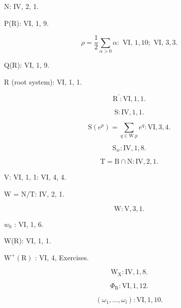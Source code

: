 N: IV, 2, 1.

P(R): VI, 1, 9.

\[
\rho = \frac {1}{2} \sum_ {\alpha > 0} \alpha : \text { VI, } 1, 10; \text { VI, } 3, 3.
\]

Q(R): VI, 1, 9.

R (root system): VI, 1, 1.

\[
\mathrm{R} ^ {\prime}: \mathrm{VI}, 1, 1.
\]

\[
\mathrm{S:IV,1,1.}
\]

\[
\mathrm{S} (e ^ {p}) = \sum_ {q \in \mathrm{W}. p} e ^ {q}: \mathrm{VI}, 3, 4.
\]

\[
\mathrm{S} _ {w}: \mathrm{IV}, 1, 8.
\]

\[
\mathrm{T} = \mathrm{B} \cap \mathrm{N}: \mathrm{IV}, 2, 1.
\]

V: VI, 1, 1: VI, 4, 4.

W = N/T: IV, 2, 1.

\[
\mathrm{W}: \mathrm{V}, 3, 1.
\]

\(w_{0}\) : VI, 1, 6.

W(R): VI, 1, 1.

\(\mathrm{W}^{+}(\mathrm{R})\) : VI, 4, Exercises.

\[
\mathrm{W} _ {\mathrm{X}}: \mathrm{IV}, 1, 8.
\]

\[
\Phi_ {\mathrm{R}}: \mathrm{VI}, 1, 12.
\]

\[
(\omega_ {1}, \dots , \omega_ {l}) \colon \mathrm{VI,1,10.}
\]

